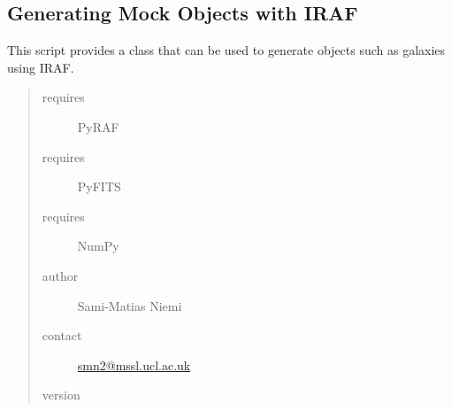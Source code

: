 \documentclass[a4paper,11pt,english]{sphinxmanual}
\begin{document}
\label{simulator:module-simulator.generateGalaxies}

\subsection{Generating Mock Objects with IRAF}
\label{simulator:generating-mock-objects-with-iraf}
This script provides a class that can be used to generate objects such as galaxies using IRAF.
\begin{quote}\begin{description}
\item[{requires}] \leavevmode
PyRAF

\item[{requires}] \leavevmode
PyFITS

\item[{requires}] \leavevmode
NumPy

\item[{author}] \leavevmode
Sami-Matias Niemi

\item[{contact}] \leavevmode
\href{mailto:smn2@mssl.ucl.ac.uk}{smn2@mssl.ucl.ac.uk}

\item[{version}] 

\end{description}\end{quote}
\end{document}
